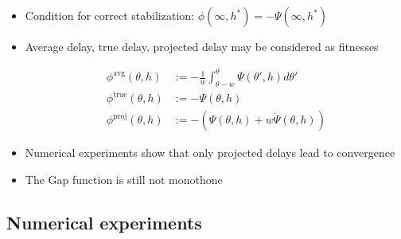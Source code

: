 \documentclass[10pt]{beamer}
\begin{document}
\begin{frame}

\begin{itemize}

\item Condition for correct stabilization: $ \phi(\infty, h^*) = - \Psi(\infty, h^*)  $


\item Average delay, true delay, projected delay may be considered as fitnesses

\begin{align*}
	\phi^{\text{avg}}(\theta, h) &:= -\frac{1}{w}\int_{\theta - w}^{\theta} \Psi(\theta', h) d \theta' \\
 	\phi^{\text{true}}(\theta, h) &:= - \Psi(\theta, h) \\
 	\phi^{\text{proj}}(\theta, h) &:= - \left( \Psi(\theta, h) + w  \dot{\Psi}(\theta, h)  \right)
\end{align*}

\item Numerical experiments show that only projected delays lead to convergence
 
\item The Gap function is still not monothone

\end{itemize}

\end{frame}


\subsection{Numerical experiments}

%
%
%
\end{document}
